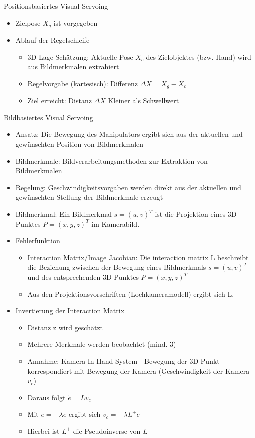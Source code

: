 \documentclass[paper=a4, fontsize=11pt]{scrartcl} %
\numberwithin{equation}{section} %
\numberwithin{figure}{section} %
\numberwithin{table}{section} %
\begin{document}
Positionsbasiertes Visual Servoing
\begin{itemize}
\item Zielpose $X_g$ ist vorgegeben
\item Ablauf der Regelschleife
\begin{itemize}
\item 3D Lage Schätzung: Aktuelle Pose $X_c$ des Zielobjektes (bzw. Hand) wird aus Bildmerkmalen extrahiert
\item Regelvorgabe (kartesisch): Differenz $\Delta X = X_g - X_c$
\item Ziel erreicht: Distanz $\Delta X$ Kleiner als Schwellwert
\end{itemize}
\end{itemize}

Bildbasiertes Visual Servoing
\begin{itemize}
\item Ansatz: Die Bewegung des Manipulators ergibt sich aus der aktuellen und gewünschten Position von Bildmerkmalen
\item Bildmerkmale: Bildverarbeitungsmethoden zur Extraktion von Bildmerkmalen
\item Regelung: Geschwindigkeitsvorgaben werden direkt aus der aktuellen und gewünschten Stellung der Bildmerkmale erzeugt
\item Bildmerkmal: Ein Bildmerkmal $s = (u,v)^T$ ist die Projektion eines 3D Punktes $P=(x,y,z)^T$ im Kamerabild.
\item Fehlerfunktion
\begin{itemize}
\item Interaction Matrix/Image Jacobian: Die interaction matrix L beschreibt die Beziehung zwischen der Bewegung eines Bildmerkmals $s=(u,v)^T$ und des entsprechenden 3D Punktes $P=(x,y,z)^T$
\item Aus den Projektionsvorschriften (Lochkameramodell) ergibt sich L.
\end{itemize}
\item Invertierung der Interaction Matrix
\begin{itemize}
\item Distanz z wird geschätzt
\item Mehrere Merkmale werden beobachtet (mind. 3)
\item Annahme: Kamera-In-Hand System - Bewegung der 3D Punkt korrespondiert mit Bewegung der Kamera (Geschwindigkeit der Kamera $v_c$)
\item Daraus folgt $\dot e = Lv_c$
\item Mit $e = -\lambda e$ ergibt sich $v_c = -\lambda L^+ e$
\item Hierbei ist $L^+$ die Pseudoinverse von $L$
\end{itemize}
\end{itemize}
\end{document}
